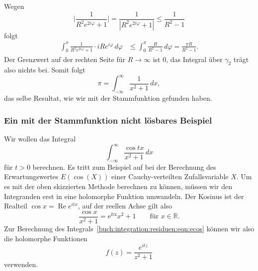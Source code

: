 Wegen
\[
\biggl|
\frac{1}{R^2e^{2i\varphi}+1}
\biggr|
=
\frac{1}{|R^2e^{2i\varphi}+1|}
\le
\frac{1}{R^2-1}
\]
folgt
\begin{align*}
\int_0^{\pi}
\frac{1}{R^2e^{2i\varphi}+1}\cdot iRe^{i\varphi}
\,d\varphi
&\le
\int_0^{\pi}
\frac{R}{R^2-1}
\,d\varphi
=
\frac{\pi R}{R^2-1}.
\end{align*}
Der Grenzwert auf der rechten Seite für $R\to\infty$ ist $0$, das
Integral über $\gamma_2$ trägt also nichts bei.
Somit folgt
\[
\pi 
=
\int_{-\infty}^\infty \frac{1}{x^2+1}\,dx,
\]
das selbe Resultat, wie wir mit der Stammfunktion gefunden haben.

%
%
\subsubsection{Ein mit der Stammfunktion nicht lösbares Beispiel}
Wir wollen das Integral
\begin{equation}
\int_{-\infty}^\infty
\frac{\cos tx}{x^2+1}
\,dx
\label{buch:integration:residuen:eqn:ecos}
\end{equation}
für $t>0$ berechnen.
Es tritt zum Beispiel auf bei der Berechnung des Erwartungswertes 
$E(\cos(X))$ einer Cauchy-verteilten Zufallsvariable $X$.
Um es mit der oben skizzierten Methode berechnen zu können,
müssen wir den Integranden erst in eine holomorphe Funktion
umwandeln.
Der Kosinus ist der Realteil $\cos x = \operatorname{Re}e^{itx}$,
auf der reellen Achse gilt also
\[
\frac{\cos x}{x^2+1}
=
\operatorname{e^{itx}}{x^2+1}
\qquad
\text{für $x\in\mathbb{R}$}.
\]
Zur Berechnung des Integrals~\eqref{buch:integration:residuen:eqn:ecos}
können wir also die holomorphe Funktionen
\begin{equation}
f(z)
=
\frac{e^{itz}}{z^2+1}
\end{equation}
verwenden.


